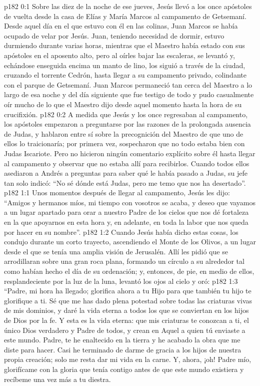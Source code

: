 \author{Comisión de seres intermedios}
\vs p182 0:1 Sobre las diez de la noche de ese jueves, Jesús llevó a los once apóstoles de vuelta desde la casa de Elías y María Marcos al campamento de Getsemaní. Desde aquel día en el que estuvo con él en las colinas, Juan Marcos se había ocupado de velar por Jesús. Juan, teniendo necesidad de dormir, estuvo durmiendo durante varias horas, mientras que el Maestro había estado con sus apóstoles en el aposento alto, pero al oírles bajar las escaleras, se levantó y, echándose enseguida encima un manto de lino, los siguió a través de la ciudad, cruzando el torrente Cedrón, hasta llegar a su campamento privado, colindante con el parque de Getsemaní. Juan Marcos permaneció tan cerca del Maestro a lo largo de esa noche y del día siguiente que fue testigo de todo y pudo casualmente oír mucho de lo que el Maestro dijo desde aquel momento hasta la hora de su crucifixión.
\vs p182 0:2 A medida que Jesús y los once regresaban al campamento, los apóstoles empezaron a preguntarse por las razones de la prolongada ausencia de Judas, y hablaron entre sí sobre la precognición del Maestro de que uno de ellos lo traicionaría; por primera vez, sospecharon que no todo estaba bien con Judas Iscariote. Pero no hicieron ningún comentario explícito sobre él hasta llegar al campamento y observar que no estaba allí para recibirlos. Cuando todos ellos asediaron a Andrés a preguntas para saber qué le había pasado a Judas, su jefe tan solo indicó: “No sé dónde está Judas, pero me temo que nos ha desertado”.
\vs p182 1:1 Unos momentos después de llegar al campamento, Jesús les dijo: “Amigos y hermanos míos, mi tiempo con vosotros se acaba, y deseo que vayamos a un lugar apartado para orar a nuestro Padre de los cielos que nos dé fortaleza en la que apoyarnos en esta hora y, en adelante, en toda la labor que nos queda por hacer en su nombre”.
\vs p182 1:2 Cuando Jesús había dicho estas cosas, los condujo durante un corto trayecto, ascendiendo el Monte de los Olivos, a un lugar desde el que se tenía una amplia visión de Jerusalén. Allí les pidió que se arrodillaran sobre una gran roca plana, formando un círculo a su alrededor tal como habían hecho el día de su ordenación; y, entonces, de pie, en medio de ellos, resplandeciente por la luz de la luna, levantó los ojos al cielo y oró:
\vs p182 1:3 “Padre, mi hora ha llegado; glorifica ahora a tu Hijo para que también tu hijo te glorifique a ti. Sé que me has dado plena potestad sobre todas las criaturas vivas de mis dominios, y daré la vida eterna a todos los que se conviertan en los hijos de Dios por la fe. Y esta es la vida eterna: que mis criaturas te conozcan a ti, el único Dios verdadero y Padre de todos, y crean en Aquel a quien tú enviaste a este mundo. Padre, te he enaltecido en la tierra y he acabado la obra que me diste para hacer. Casi he terminado de darme de gracia a los hijos de nuestra propia creación; solo me resta dar mi vida en la carne. Y, ahora, ¡oh! Padre mío, glorifícame con la gloria que tenía contigo antes de que este mundo existiera y recíbeme una vez más a tu diestra.
